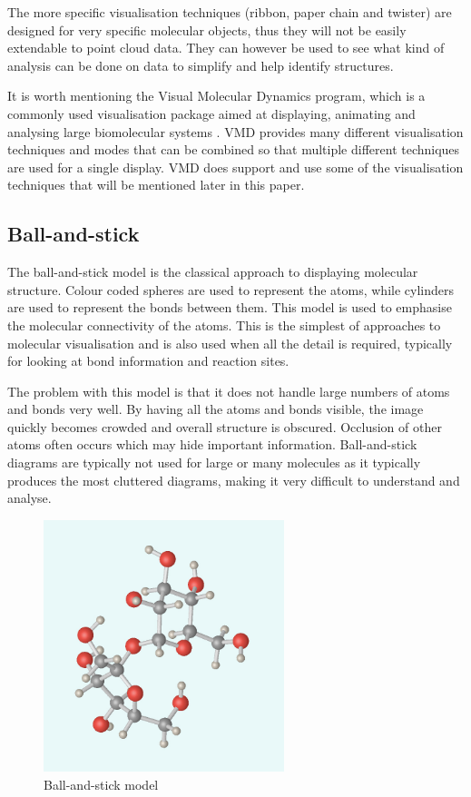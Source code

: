 \documentclass[a4paper]{article}
\begin{document}
The more specific visualisation techniques (ribbon, paper chain and twister) are
designed for very specific molecular objects, thus they will not be easily
extendable to point cloud data. They can however be used to see what kind of
analysis can be done on data to simplify and help identify structures.

It is worth mentioning the Visual Molecular Dynamics \citep{humphrey96} program,
which is a commonly used visualisation package aimed at displaying, animating
and analysing large biomolecular systems \citep{VMD}. VMD provides many
different visualisation techniques and modes that can be combined so that
multiple different techniques are used for a single display. VMD does support
and use some of the visualisation techniques that will be mentioned later in
this paper.

\subsection*{Ball-and-stick}
The ball-and-stick model is the classical approach to displaying molecular
structure. Colour coded spheres are used to represent the atoms, while cylinders
are used to represent the bonds between them. This model is used to emphasise
the molecular connectivity of the atoms. This is the simplest of approaches to
molecular visualisation and is also used when all the detail is required,
typically for looking at bond information and reaction sites.

The problem with this model is that it does not handle large numbers of atoms
and bonds very well. By having all the atoms and bonds visible, the image
quickly becomes crowded and overall structure is obscured. Occlusion of other
atoms often occurs which may hide important information. Ball-and-stick diagrams
are typically not used for large or many molecules as it typically produces the
most cluttered diagrams, making it very difficult to understand and analyse.

\begin{figure}[h!]
  \begin{center}
    \includegraphics[width=70mm]{BallStick}
  \end{center}
  \caption{Ball-and-stick model}
  \label{fig:ballstick}
\end{figure}
\end{document}
